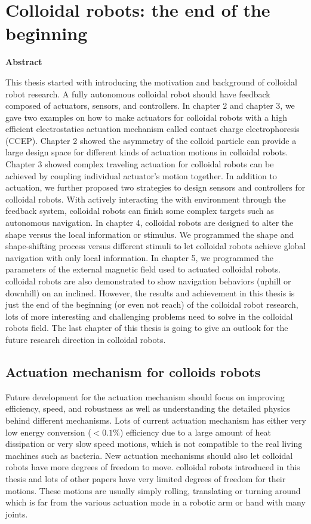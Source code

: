 \chapter{Colloidal robots: the end of the beginning }
\begin{center}
\textbf{Abstract}
\end{center}
This thesis started with introducing the motivation and background of colloidal robot research. A fully autonomous colloidal robot should have feedback composed of actuators, sensors, and controllers.  In chapter 2 and chapter 3, we gave two examples on how to make actuators for colloidal robots with a high efficient electrostatics actuation mechanism called contact charge electrophoresis (CCEP). Chapter 2 showed the asymmetry of the colloid particle can provide a large design space for different kinds of actuation motions in colloidal robots.  Chapter 3 showed complex traveling actuation for colloidal robots can be achieved by coupling individual actuator's motion together.  In addition to actuation, we further proposed two strategies to design sensors and controllers for colloidal robots. With actively interacting the with environment through the feedback system, colloidal robots can finish some complex targets such as autonomous navigation. In chapter 4, colloidal robots are designed to alter the shape versus the local information or stimulus. We programmed the shape and shape-shifting process versus different stimuli to let colloidal robots achieve global navigation with only local information. In chapter 5, we programmed the parameters of the external magnetic field used to actuated colloidal robots. colloidal robots are also demonstrated to show navigation behaviors  (uphill or downhill) on an inclined. However, the results and achievement in this thesis is just the end of the beginning (or even not reach) of the colloidal robot research, lots of more interesting and challenging problems need to solve in the colloidal robots field. The last chapter of this thesis is going to give an outlook for the future research direction in colloidal robots.
\section{Actuation mechanism for  colloids robots}
Future development for  the actuation mechanism should focus on improving efficiency, speed, and robustness as well as understanding the detailed physics behind different mechanisms. Lots of current actuation mechanism has either very low energy conversion ($<0.1\%$) efficiency due to a large amount of heat dissipation or very slow speed motions, which is not compatible to the real living machines such as bacteria. New actuation mechanisms should also let colloidal robots have more degrees of freedom to move. colloidal robots introduced in this thesis and lots of other papers have very limited degrees of freedom for their motions. These motions are usually simply rolling, translating or turning around which is far from the various actuation mode in a robotic arm or hand with many joints. 

